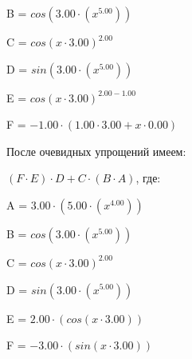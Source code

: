 \documentclass{article}
\begin{document}
\qquad B = $cos(3.00 \cdot ({x}^{5.00}))$

\qquad C = ${cos(x \cdot 3.00)}^{2.00}$

\qquad D = $sin(3.00 \cdot ({x}^{5.00}))$

\qquad E = ${cos(x \cdot 3.00)}^{2.00 - 1.00}$

\qquad F = $-1.00 \cdot (1.00 \cdot 3.00 + x \cdot 0.00)$



\bigskip После очевидных упрощений имеем:

$(F \cdot E) \cdot D + C \cdot (B \cdot A)$, где:

\bigskip\qquad A = $3.00 \cdot (5.00 \cdot ({x}^{4.00}))$

\qquad B = $cos(3.00 \cdot ({x}^{5.00}))$

\qquad C = ${cos(x \cdot 3.00)}^{2.00}$

\qquad D = $sin(3.00 \cdot ({x}^{5.00}))$

\qquad E = $2.00 \cdot (cos(x \cdot 3.00))$

\qquad F = $-3.00 \cdot (sin(x \cdot 3.00))$
\end{document}
